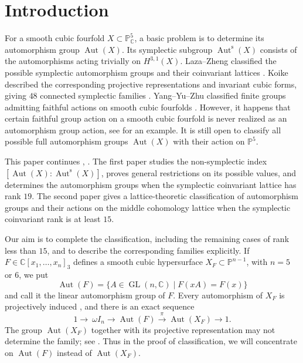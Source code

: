 \documentclass[12pt]{amsart}
\numberwithin{equation}{section}
\theoremstyle{plain}
\theoremstyle{definition}
\theoremstyle{remark}
\newcommand{\CC}{\mathbb C}
\newcommand{\PP}{\mathbb P}
\DeclareMathOperator{\Aut}{Aut}
\DeclareMathOperator{\GL}{GL}
\newcommand{\Auts}{\Aut^{\mathrm s}}
\begin{document}
\section{Introduction}

For a smooth cubic fourfold $X\subset\PP^5_{\CC}$, a basic problem is to
determine its automorphism group $\Aut(X)$.  Its symplectic subgroup
$\Auts(X)$ consists of the automorphisms acting trivially on
$H^{3,1}(X)$.  Laza--Zheng classified the possible symplectic automorphism
groups and their coinvariant lattices \cite{laza2022automorphisms}.
Koike described the corresponding projective representations and
invariant cubic forms, giving $48$ connected symplectic families
\cite{KOIKE202512,KOIKE2026}.  Yang--Yu--Zhu classified finite groups
admitting faithful actions on smooth cubic fourfolds
\cite{yang2024automorphism}. However, it happens that certain faithful group action on a smooth cubic fourfold is never realized as an automorphism group action, see \cite[Theorem~1.2(5)(b)]{laza2022automorphisms} for an example. It is still open to classify all possible full automorphism groups $\Aut(X)$ with their action on $\PP^5$. 

This paper continues \cite{FWZ26}, \cite{FZ26}.  The first paper studies the
non-symplectic index $[\Aut(X):\Auts(X)]$, proves general restrictions on
its possible values, and determines the automorphism groups when
the symplectic coinvariant lattice has rank $19$.  The second paper
gives a lattice-theoretic classification of automorphism groups and
their actions on the middle cohomology lattice when the symplectic
coinvariant rank is at least $15$.

Our aim is to complete the classification, including the remaining
cases of rank less than $15$, and to describe the corresponding
families explicitly. If
$F\in\CC[x_1,\ldots,x_n]_3$ defines a smooth cubic hypersurface
$X_F\subset\PP^{n-1}$, with $n=5$ or $6$, we put
\[
\Aut(F)=\{A\in\GL(n,\CC)\mid F(xA)=F(x)\}
\]
and call it the linear automorphism group of $F$. Every automorphism of $X_F$ is projectively induced
\cite{Matsumura1963OnTA}, and there is an exact sequence
\[
1\longrightarrow\ \omega I_n\longrightarrow\Aut(F)
\overset{\pi}{\longrightarrow}\Aut(X_F)\longrightarrow1.
\]
The group $\Aut(X_F)$ together with its projective representation may not determine the family; see \cite[\S 8 (8.6)]{KOIKE202512}. Thus in the proof of classification, we will concentrate on $\Aut(F)$ instead of $\Aut(X_F)$.
\end{document}

